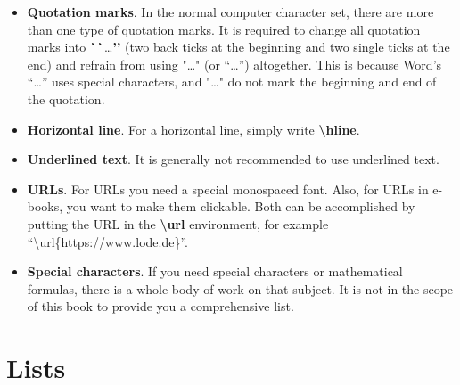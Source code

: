 \begin{itemize}
    \item \textbf{Quotation marks}. In the normal computer character set, there are more than one type of quotation marks. It is required to change all quotation marks into \textbf{\`{}\`{}}\dots\textbf{\rq\rq} (two back ticks at the beginning and two single ticks at the end) and refrain from using "\dots" (or “\dots”) altogether. This is because Word's “\dots” uses special characters, and "\dots" do not mark the beginning and end of the quotation.
    
    \item \textbf{Horizontal line}. For a horizontal line, simply write \textbf{\textbackslash hline}.
    
    \item \textbf{Underlined text}. It is generally not recommended to use underlined text.
    
    \item \textbf{URLs}. For URLs you need a special monospaced font. Also, for URLs in e-books, you want to make them clickable. Both can be accomplished by putting the URL in the \textbf{\textbackslash url} environment, for example ``\textbackslash url\{https://www.lode.de\}''.
    
    \item \textbf{Special characters}. If you need special characters or mathematical formulas, there is a whole body of work on that subject. It is not in the scope of this book to provide you a comprehensive list.
\end{itemize}


\section{Lists}\label{c1_lists:sec}

